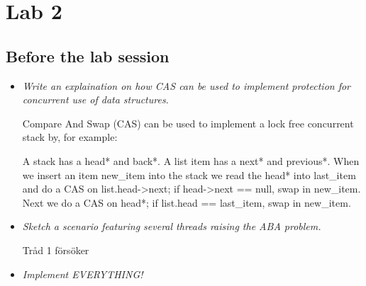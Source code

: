 \documentclass[a4paper,12pt]{article}
\begin{document}
\section{Lab 2}
\subsection{Before the lab session}

\begin{itemize}
\item \textit{Write an explaination on how CAS can be used to implement protection for concurrent use of data structures.}

  Compare And Swap (CAS) can be used to implement a lock free concurrent stack by, for example:

  A stack has a head* and back*. A list item has a next* and previous*. When we insert an item new_item into the stack we read the head* into last_item and do a CAS on list.head->next; if head->next == null, swap in new_item. Next we do a CAS on head*; if list.head == last_item, swap in new_item.

\item \textit{Sketch a scenario featuring several threads raising the ABA problem.}

Tråd 1 försöker

\item \textit{Implement EVERYTHING!}

\end{itemize}
\end{document}
